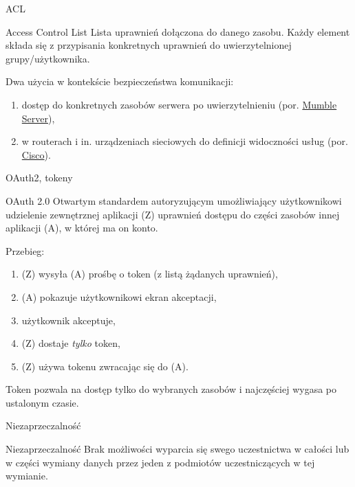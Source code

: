 \begin{frame}{ACL}
	
	\begin{alertblock}{Access Control List}
		Lista uprawnień dołączona do danego zasobu. Każdy element składa się z przypisania konkretnych uprawnień do uwierzytelnionej grupy/użytkownika.
	\end{alertblock}
	
	Dwa użycia w kontekście bezpieczeństwa komunikacji:
	\begin{enumerate}
		\item dostęp do konkretnych zasobów serwera po uwierzytelnieniu (por. \href{http://wiki.mumble.info/wiki/ACL_and_Groups/English}{Mumble Server}),
		\item w routerach i in. urządzeniach sieciowych do definicji widoczności usług (por. \href{http://www.cisco.com/c/en/us/td/docs/ios/12_2/security/configuration/guide/fsecur_c/scfacls.html}{Cisco}).
	\end{enumerate}
	
\end{frame}

\begin{frame}{OAuth2, tokeny}
	
	\begin{alertblock}{OAuth 2.0}
		Otwartym standardem autoryzującym umożliwiający użytkownikowi udzielenie zewnętrznej aplikacji (Z) uprawnień dostępu do części zasobów innej aplikacji (A), w której ma on konto.
	\end{alertblock}
	
	Przebieg:
	\begin{enumerate}
		\item (Z) wysyła (A) prośbę o token (z listą żądanych uprawnień),
		\item (A) pokazuje użytkownikowi ekran akceptacji,
		\item użytkownik akceptuje,
		\item (Z) dostaje \emph{tylko} token,
		\item (Z) używa tokenu zwracając się do (A).
	\end{enumerate}
	
	Token pozwala na dostęp tylko do wybranych zasobów i najczęściej wygasa po ustalonym czasie.

\end{frame}

\begin{frame}{Niezaprzeczalność}
	
	\begin{alertblock}{Niezaprzeczalność}
		Brak możliwości wyparcia się swego uczestnictwa w całości lub w części wymiany danych przez jeden z podmiotów uczestniczących w tej wymianie.
	\end{alertblock}
	
\end{frame}

